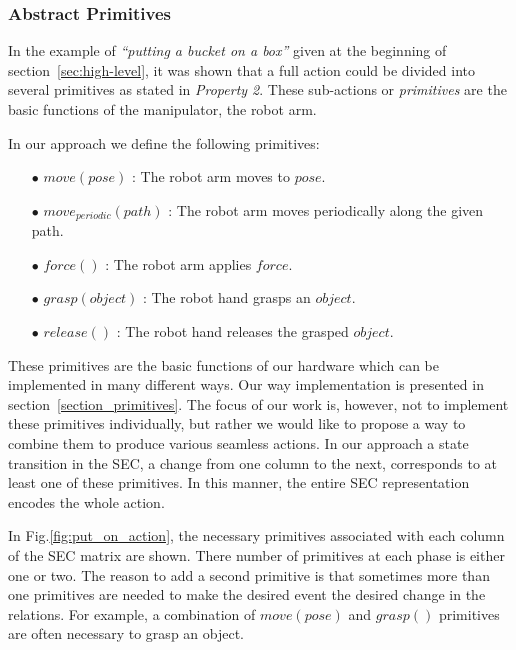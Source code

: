 \subsubsection{Abstract Primitives}
\label{sec:abstract_primitives}

In the example of {\it ``putting a bucket on a box''} given at the beginning of section~\ref{sec:high-level}, it was shown that a full action could be divided into several primitives as stated in {\it Property 2}.
These sub-actions or \textit{primitives} are the basic functions of the manipulator, \ie the robot arm.

In our approach we define the following primitives:
\begin{itemize}
 \item[$\bullet$] $move(pose)$ :  The robot arm moves to $pose$.
 \item[$\bullet$] $move_{periodic}(path)$ : The robot arm moves periodically along the given path.
 \item[$\bullet$] $force()$ : The robot arm applies $force$.
 \item[$\bullet$] $grasp(object)$ : The robot hand grasps an $object$.
 \item[$\bullet$] $release()$ : The robot hand releases the grasped $object$.
\end{itemize}


These primitives are the basic functions of our hardware which can be implemented in many different ways.
Our way implementation is presented in section~\ref{section_primitives}.
The focus of our work is, however, not to implement these primitives individually,
but rather we would like to propose a way to combine them to produce various seamless actions.
In our approach a state transition in the SEC, \ie a change from one column to the next, corresponds to at least one of these primitives.
In this manner, the entire SEC representation  encodes the whole action.

In Fig.\ref{fig:put_on_action}, the necessary primitives associated with each column of the SEC matrix are shown.
There number of primitives at each phase is either one or two.
The reason to add a second primitive is that sometimes more than one primitives are needed to make the desired event \ie the desired change in the relations.
For example, a combination of $move(pose)$ and $grasp()$ primitives are often necessary to grasp an object.

